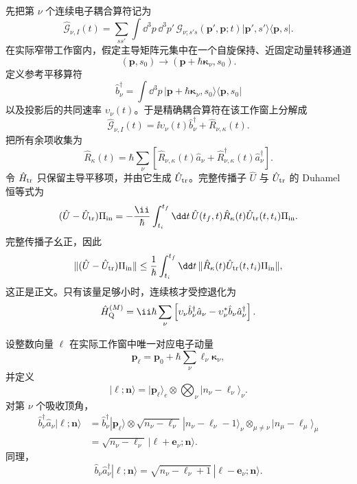 \begin{derivation}

先把第 $\nu$ 个连续电子耦合算符记为
\[
\hat{\mathcal G}_{\nu,I}(t)
=
\sum_{ss'}
\int\dd^3p\,\dd^3p'\,
\mathcal G_{\nu;s's}(\mathbf p',\mathbf p;t)
|\mathbf p',s'\rangle\langle\mathbf p,s|.
\]
在实际窄带工作窗内，假定主导矩阵元集中在一个自旋保持、近固定动量转移通道
\[
(\mathbf p,s_0)
\longrightarrow
(\mathbf p+\hbar\boldsymbol\kappa_\nu,s_0).
\]
定义参考平移算符
\[
\hat b_\nu^\dagger
=
\int\dd^3p\,
|\mathbf p+\hbar\boldsymbol\kappa_\nu,s_0\rangle
\langle\mathbf p,s_0|
\]
以及投影后的共同速率 $\upsilon_\nu(t)$。于是精确耦合算符在该工作窗上分解成
\[
\hat{\mathcal G}_{\nu,I}(t)
=
\ii\upsilon_\nu(t)\hat b_\nu^\dagger
+
\hat R_{\nu,\kappa}(t).
\]
把所有余项收集为
\[
\hat R_\kappa(t)
=
\hbar
\sum_\nu
\left[
\hat R_{\nu,\kappa}(t)\hat a_\nu
+
\hat R_{\nu,\kappa}^\dagger(t)\hat a_\nu^\dagger
\right].
\]
令 $\hat H_{\rm tr}$ 只保留主导平移项，并由它生成 $\hat U_{\rm tr}$。完整传播子 $\hat U$ 与 $\hat U_{\rm tr}$ 的 Duhamel 恒等式为
\[
(\hat U-\hat U_{\rm tr})\Pi_{\rm in}
=
-\frac{\ii}{\hbar}
\int_{t_i}^{t_f}\dd t\,
\hat U(t_f,t)
\hat R_\kappa(t)
\hat U_{\rm tr}(t,t_i)\Pi_{\rm in}.
\]
完整传播子幺正，因此
\[
\|(\hat U-\hat U_{\rm tr})\Pi_{\rm in}\|
\le
\frac1\hbar
\int_{t_i}^{t_f}\dd t\,
\|
\hat R_\kappa(t)
\hat U_{\rm tr}(t,t_i)\Pi_{\rm in}
\|,
\]
这正是正文。只有该量足够小时，连续核才受控退化为
\[
\hat H_{\rm Q}^{(M)}
=
\ii\hbar\sum_\nu
\left[
\upsilon_\nu\hat b_\nu^\dagger\hat a_\nu
-\upsilon_\nu^*\hat b_\nu\hat a_\nu^\dagger
\right].
\]

设整数向量 $\boldsymbol\ell$ 在实际工作窗中唯一对应电子动量
\[
\mathbf p_{\boldsymbol\ell}
=
\mathbf p_0
+\hbar\sum_\nu\ell_\nu\boldsymbol\kappa_\nu,
\]
并定义
\[
|\boldsymbol\ell;\mathbf n\rangle
=
|\mathbf p_{\boldsymbol\ell}\rangle_e
\otimes
\bigotimes_\nu
|n_\nu-\ell_\nu\rangle_\nu .
\]
对第 $\nu$ 个吸收顶角，
\begin{align*}
\hat b_\nu^\dagger\hat a_\nu
|\boldsymbol\ell;\mathbf n\rangle
&=
\hat b_\nu^\dagger
|\mathbf p_{\boldsymbol\ell}\rangle
\otimes
\sqrt{n_\nu-\ell_\nu}\,
|n_\nu-\ell_\nu-1\rangle_\nu
\otimes_{\mu\neq\nu}
|n_\mu-\ell_\mu\rangle_\mu\\
&=
\sqrt{n_\nu-\ell_\nu}\,
|\boldsymbol\ell+\mathbf e_\nu;\mathbf n\rangle .
\end{align*}
同理，
\[
\hat b_\nu\hat a_\nu^\dagger
|\boldsymbol\ell;\mathbf n\rangle
=
\sqrt{n_\nu-\ell_\nu+1}\,
|\boldsymbol\ell-\mathbf e_\nu;\mathbf n\rangle .
\]


\end{derivation}
